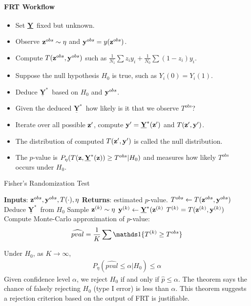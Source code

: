 \documentclass[11pt]{article}
\newcommand{\science}[0]{\underline{\textbf{Y}}}
\begin{document}
	\paragraph{FRT Workflow}
	\begin{itemize}
		\item Set \science\  fixed but unknown.
		\item Observe $\textbf{z}^{obs} \sim \eta$ and $\textbf{y}^{obs} = y(\textbf{z}^{obs})$.
		\item Compute $T(\textbf{z}^{obs}, \textbf{y}^{obs})$ such as $\frac{1}{N_1} \sum z_i y_i + \frac{1}{N_0} \sum (1-z_i) y_i$.
		\item Suppose the null hypothesis $H_0$ is true, such as $Y_i(0) = Y_i(1)$.
		\item Deduce $\science^*$\ based on $H_0$ and $\textbf{y}^{obs}$.
		\item Given the deduced $\science^*$\, how likely is it that we observe $T^{obs}$?
		\item Iterate over all possible $\textbf{z}'$, compute $\vey' = \science^*(\vez')$ and $T(\textbf{z}', \textbf{y}')$.
		\item The distribution of computed $T(\textbf{z}', \textbf{y}')$ is called the null distribution.
		\item The $p$-value is $P_\eta(T(\vez, \science^*(\vez)) \geq T^{obs} | H_0)$ and measures how likely $T^{obs}$ occurs under $H_0$.
	\end{itemize}
	
	\begin{algorithm}[H]
		\caption{Fisher's Randomization Test}
		\textbf{Inputs}: $\textbf{z}^{obs}, \textbf{y}^{obs}, T(\cdot), \eta$\;
		\textbf{Returns}: estimated $p$-value.\;
		$T^{obs} \leftarrow T(\textbf{z}^{obs}, \textbf{y}^{obs})$\;
		Deduce $\science^*$\ from $H_0$\;
		 {
			Sample $\textbf{z}^{(k)} \sim \eta$\;
			$\vey^{(k)} \leftarrow \science^*(\vez^{(k)}$\;
			$T^{(k)} = T(\textbf{z}^{(k)}, \textbf{y}^{(k)})$\;
		}
		Compute Monte-Carlo approximation of $p$-value:
		\begin{align*}
			\widehat{pval} = \frac{1}{K} \sum \id{T^{(k)} \geq T^{obs}}
		\end{align*}
	\end{algorithm}
	
	\begin{theorem}
		Under $H_0$, as $K \to \infty$, 
		\begin{align}
			P_\eta(\widehat{pval} \leq \alpha | H_0) \leq \alpha
		\end{align}
		Given confidence level $\alpha$, we reject $H_0$ if and only if $\hat{p} \leq \alpha$. The theorem says the chance of falsely rejecting $H_0$ (type I error) is less than $\alpha$.
		This theorem suggests a rejection criterion based on the output of FRT is justifiable.
	\end{theorem}
	
\end{document}
